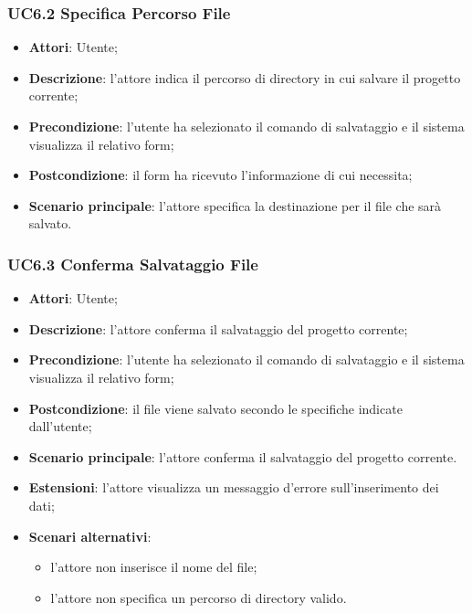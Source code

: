 \subsubsection{UC6.2 Specifica Percorso File}
\label{UC6.2}
\begin{itemize}
	\item \textbf{Attori}: Utente;
	\item \textbf{Descrizione}: l'attore indica il percorso di directory in cui salvare il progetto corrente;
	\item \textbf{Precondizione}: l'utente ha selezionato il comando di salvataggio e il sistema visualizza il relativo form;
	\item \textbf{Postcondizione}: il form ha ricevuto l'informazione di cui necessita;
	\item \textbf{Scenario principale}: l'attore specifica la destinazione per il file che sarà salvato.
\end{itemize}

\subsubsection{UC6.3 Conferma Salvataggio File}
\label{UC6.3}
\begin{itemize}
	\item \textbf{Attori}: Utente;
	\item \textbf{Descrizione}: l'attore conferma il salvataggio del progetto corrente;
	\item \textbf{Precondizione}: l'utente ha selezionato il comando di salvataggio e il sistema visualizza il relativo form;
	\item \textbf{Postcondizione}: il file viene salvato secondo le specifiche indicate dall'utente;
	\item \textbf{Scenario principale}: l'attore conferma il salvataggio del progetto corrente.
	\item \textbf{Estensioni}: l'attore visualizza un messaggio d'errore sull'inserimento dei dati;
	\item \textbf{Scenari alternativi}:
		\begin{itemize}
		\item l'attore non inserisce il nome del file;
		\item l'attore non specifica un percorso di directory valido.
	\end{itemize}
\end{itemize}

